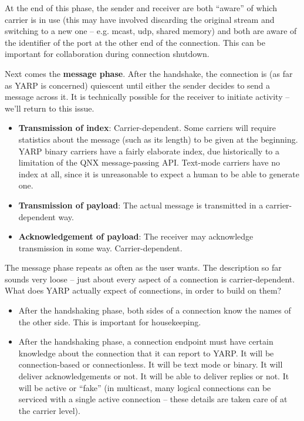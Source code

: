 At the end of this phase, the sender and receiver are both ``aware''
of which carrier is in use (this may have involved discarding the
original stream and switching to a new one -- e.g. mcast, udp, shared
memory) and both are aware of the identifier of the port at the
other end of the connection.  This can be important for collaboration
during connection shutdown.


Next comes the {\bf message phase}.
After the handshake, the connection is (as far as YARP is concerned)
quiescent until either the sender decides to send a message across it.
It is technically possible for the receiver to initiate activity --
we'll return to this issue.

\begin{itemize} \pflist

\item {\bf Transmission of index}: Carrier-dependent. Some carriers
will require statistics about the message (such as its length) to be
given at the beginning.  YARP binary carriers have a fairly elaborate
index, due historically to a limitation of the QNX message-passing
API.  Text-mode carriers have no index at all, since it is
unreasonable to expect a human to be able to generate one.

\item {\bf Transmission of payload}: The actual message is
transmitted in a carrier-dependent way.

\item {\bf Acknowledgement of payload}: The receiver may 
acknowledge transmission in some way.  Carrier-dependent.

\end{itemize}

The message phase repeats as often as the user wants.
%
The description so far sounds very loose -- just about every aspect
of a connection is carrier-dependent.  What does YARP actually
expect of connections, in order to build on them?

\begin{itemize} \pflist

\item After the handshaking phase, both sides of a connection know the
names of the other side.  This is important for housekeeping.

\item After the handshaking phase, a connection endpoint must have
certain knowledge about the connection that it can report to YARP.  It
will be connection-based or connectionless.  It will be text mode or
binary.  It will deliver acknowledgements or not.  It will be able to
deliver replies or not.  It will be active or ``fake'' (in multicast,
many logical connections can be serviced with a single active
connection -- these details are taken care of at the carrier level).

\end{itemize}

